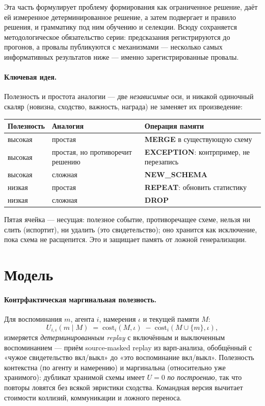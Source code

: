 \documentclass{article}
\begin{document}
Эта часть формулирует проблему формирования как ограниченное
решение, даёт ей измеренное детерминированное решение, а затем
подвергает и правило решения, и грамматику под ним обучению и
селекции. Всюду сохраняется методологическое обязательство серии:
предсказания регистрируются до прогонов, а провалы публикуются с
механизмами --- несколько самых информативных результатов ниже ---
именно зарегистрированные провалы.

\paragraph{Ключевая идея.} Полезность и простота аналогии --- две
\emph{независимые} оси, и никакой одиночный скаляр (новизна,
сходство, важность, награда) не заменяет их произведение:

\begin{center}
\small
\begin{tabular}{lll}
\toprule
Полезность & Аналогия & Операция памяти \\
\midrule
высокая & простая & \textbf{MERGE} в существующую схему \\
высокая & простая, но противоречит решению & \textbf{EXCEPTION}:
контрпример, не перезапись \\
высокая & сложная & \textbf{NEW\_SCHEMA} \\
низкая & простая & \textbf{REPEAT}: обновить статистику \\
низкая & сложная & \textbf{DROP} \\
\bottomrule
\end{tabular}
\end{center}

Пятая ячейка --- несущая: полезное событие, противоречащее схеме,
нельзя ни слить (испортит), ни удалить (это свидетельство); оно
хранится как исключение, пока схема не расщепится. Это и защищает
память от ложной генерализации.

\section{Модель}
\label{p5:sec:model}

\paragraph{Контрфактическая маргинальная полезность.} Для
воспоминания $m$, агента $i$, намерения $\iota$ и текущей памяти $M$:
\[
U_{i,\iota}(m \mid M) \;=\;
\mathrm{cost}_i(M, \iota) \;-\; \mathrm{cost}_i(M \cup \{m\}, \iota),
\]
измеряется \emph{детерминированным replay} с включённым и выключенным
воспоминанием --- приём source-masked replay из варп-анализа,
обобщённый с «чужое свидетельство вкл/выкл» до «это воспоминание
вкл/выкл». Полезность контекстна (по агенту и намерению) и
маргинальна (относительно уже хранимого): дубликат хранимой схемы
имеет $U = 0$ \emph{по построению}, так что повторы ловятся без
всякой эвристики сходства. Командная версия вычитает стоимости
коллизий, коммуникации и ложного переноса.
\end{document}
